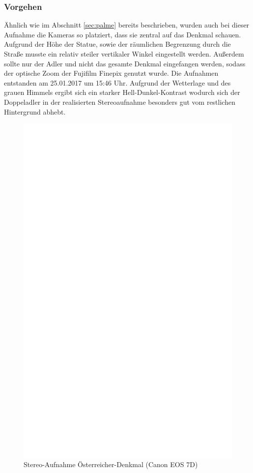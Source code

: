 \documentclass[liststotoc,bibtotoc,fontsize=14pt,]{scrreprt}
\begin{document}
\subsubsection{Vorgehen}
Ähnlich wie im Abschnitt \ref{sec:palme} bereits beschrieben, wurden auch bei dieser Aufnahme die Kameras so platziert, dass sie zentral auf das Denkmal schauen. Aufgrund der Höhe der Statue, sowie der räumlichen Begrenzung durch die Straße musste ein relativ steiler vertikaler Winkel eingestellt werden. Außerdem sollte nur der Adler und nicht das gesamte Denkmal eingefangen werden, sodass der optische Zoom der Fujifilm Finepix genutzt wurde. Die Aufnahmen entstanden am 25.01.2017 um 15:46 Uhr. Aufgrund der Wetterlage und des grauen Himmels ergibt sich ein starker Hell-Dunkel-Kontrast wodurch sich der Doppeladler in der realisierten Stereoaufnahme besonders gut vom restlichen Hintergrund abhebt. 

\newpage
\begin{figure}[h]
	\includegraphics[width=\linewidth]{img/ph.jpg}
	\caption{Stereo-Aufnahme Österreicher-Denkmal (Canon EOS 7D)}
\end{figure}
\end{document}
